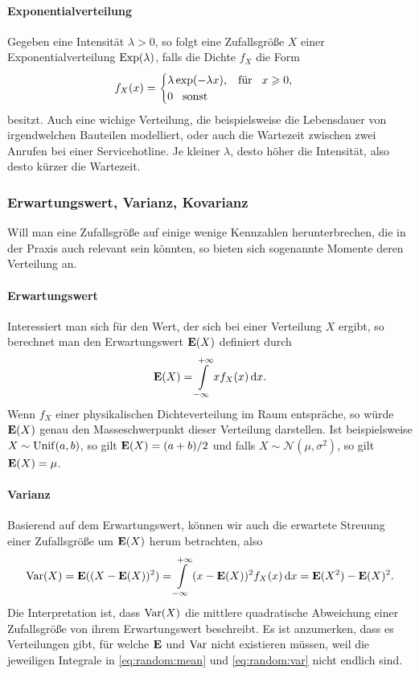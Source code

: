 \paragraph{Exponentialverteilung}
Gegeben eine Intensität $\lambda > 0$, so folgt eine Zufallsgröße $X$ einer Exponentialverteilung $\operatorname*{Exp}(\lambda)$, falls die Dichte $f_X$ die Form 
\[
f_X(x) = \begin{cases}
    \lambda \exp(-\lambda x), {\hspace{3mm} \text{für} \hspace{3mm}} x \geqslant
    0, \\
    0 {\hspace{3mm} \text{sonst} \hspace{3mm}}
\end{cases}
\]
besitzt.
Auch eine wichige Verteilung, die beispielsweise die Lebensdauer von irgendwelchen Bauteilen modelliert, oder auch die Wartezeit zwischen zwei Anrufen bei einer Servicehotline. 
Je kleiner $\lambda$, desto höher die Intensität, also desto kürzer die Wartezeit.
%
%
\subsubsection{Erwartungswert, Varianz, Kovarianz}

Will man eine Zufallsgröße auf einige wenige Kennzahlen herunterbrechen, die in der Praxis auch relevant sein könnten, so bieten sich sogenannte Momente deren Verteilung an.
%
%
\paragraph{Erwartungswert}
Interessiert man sich für den Wert, der sich  bei einer Verteilung $X$ ergibt, so berechnet man den Erwartungswert $\bm{\mathrm{E}}(X)$ definiert durch
\begin{equation}\label{eq:random:mean}
    \bm{\mathrm{E}}(X) = {\int\limits_{-\infty}^{+\infty}{x f_X(x)}\,\mathrm{d}{x}}.
\end{equation}
Wenn $f_X$ einer physikalischen Dichteverteilung im Raum entspräche, so würde $\bm{\mathrm{E}}(X)$ genau den Masseschwerpunkt dieser Verteilung darstellen.
Ist beispielsweise $X \sim \operatorname*{Unif}(a,b)$, so gilt $\bm{\mathrm{E}}(X) = (a+b)/2$ und falls $X \sim \mathcal{N}(\mu, \sigma^2)$, so gilt $\bm{\mathrm{E}}(X) = \mu$.
%
%
\paragraph{Varianz}
%
Basierend auf dem Erwartungswert, können wir auch die erwartete Streuung einer Zufallsgröße um $\bm{\mathrm{E}}(X)$ herum betrachten, also
%
\begin{equation}\label{eq:random:var}
\operatorname*{Var}(X) 
    = \bm{\mathrm{E}}((X - \bm{\mathrm{E}}(X))^2) 
    = {\int\limits_{-\infty}^{+\infty}{(x-\bm{\mathrm{E}}(X))^2 f_X(x)}\,\mathrm{d}{x}}
    = \bm{\mathrm{E}}(X^2) - \bm{\mathrm{E}}(X)^2.
\end{equation}
%
Die Interpretation ist, dass $\operatorname*{Var}(X)$ die mittlere quadratische Abweichung einer Zufallsgröße von ihrem Erwartungswert beschreibt.
Es ist anzumerken, dass es Verteilungen gibt, für welche $\bm{\mathrm{E}}$ und $\operatorname*{Var}$ nicht existieren müssen, weil die jeweiligen Integrale in \eqref{eq:random:mean} und \eqref{eq:random:var} nicht endlich sind.

